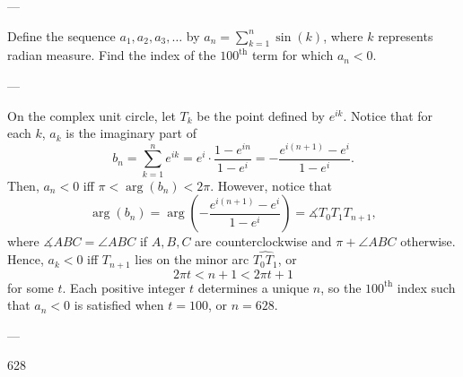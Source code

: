 
---

Define the sequence $a_1,a_2,a_3,\ldots$ by $a_n=\sum_{k=1}^n\sin(k)$, where $k$ represents radian measure. Find the index of the $100^\text{th}$ term for which $a_n<0$.

---

On the complex unit circle, let $T_k$ be the point defined by $e^{ik}$. Notice that for each $k$, $a_k$ is the imaginary part of \[b_n=\sum_{k=1}^n e^{ik}=e^i\cdot\frac{1-e^{in}}{1-e^i}=-\frac{e^{i(n+1)}-e^i}{1-e^i}.\]
Then, $a_n<0$ iff $\pi<\arg(b_n)<2\pi$. However, notice that \[\arg(b_n)=\arg\left(-\frac{e^{i(n+1)}-e^i}{1-e^i}\right)=\measuredangle T_0T_1T_{n+1},\]
where $\measuredangle ABC=\angle ABC$ if $A,B,C$ are counterclockwise and $\pi+\angle ABC$ otherwise. Hence, $a_k<0$ iff $T_{n+1}$ lies on the minor arc $\widehat{T_0T_1}$, or \[2\pi t<n+1<2\pi t+1\]
for some $t$. Each positive integer $t$ determines a unique $n$, so the $100^\text{th}$ index such that $a_n<0$ is satisfied when $t=100$, or $n=628$.

---

628

